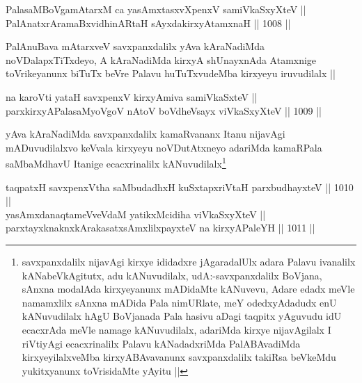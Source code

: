 
\begin{shl}
PalasaMBoVgamAtarxM ca yasAmxtasxvXpenxV samiVkaSxyXteV || \\
PalAnatxrAramaBxvidhinARtaH sAyxdakirxyAtamxnaH ||  1008 ||  
\end{shl}

\begin{artha}
PalAnuBava mAtarxveV savxpanxdalilx yAva kAraNadiMda noVDalapxTiTxdeyo, A kAraNadiMda kirxyA shUnayxnAda Atamxnige toVrikeyanunx biTuTx beVre Palavu huTuTxvudeMba kirxyeyu iruvudilalx ||
\end{artha}


\begin{shl}
na karoVti yataH savxpenxV kirxyAmiva samiVkaSxteV ||  \\
parxkirxyAPalasaMyoVgoV nAtoV boVdheV\s sayx viVkaSxyXteV ||  1009 ||  
\end{shl}

\begin{artha}
yAva kAraNadiMda savxpanxdalilx kamaRvananx Itanu nijavAgi mADuvudilalxvo keVvala kirxyeyu noVDutAtxneyo adariMda kamaRPala saMbaMdhavU Itanige ecacxrinalilx kANuvudilalx\footnote{savxpanxdalilx nijavAgi kirxye ididadxre jAgaradalUlx adara Palavu ivanalilx kANabeVkAgitutx, adu kANuvudilalx, udA:-savxpanxdalilx BoVjana, sAnxna modalAda kirxyeyanunx mADidaMte kANuvevu, Adare edadx meVle namamxlilx sAnxna mADida Pala nimURlate, meY odedxyAdadudx enU kANuvudilalx hAgU BoVjanada Pala hasivu aDagi taqpitx yAguvudu idU ecacxrAda meVle namage kANuvudilalx, adariMda kirxye nijavAgilalx I riVtiyAgi ecacxrinalilx Palavu kANadadxriMda PalABAvadiMda kirxyeyilalxveMba kirxyABAvavanunx savxpanxdalilx takiRsa beVkeMdu yukitxyanunx toVrisidaMte yAyitu ||}
\end{artha}


\begin{shl}
taqpatxH savxpenxV\s tha saMbudadhxH kuSxtapxriVtaH parxbudhayxteV ||  1010 ||  \\
yasAmxdanaqtameVveVdaM yatikxMcidiha viVkaSxyXteV || 
parxtayxknaknxkArakasatxsAmxlilxpayxteV na kirxyAPaleYH ||  1011 ||  \\
\end{shl}

